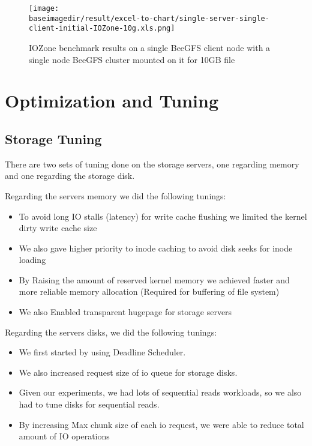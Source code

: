 \documentclass{article}
\newcommand{\baseimagedir}{..}
\begin{document}
\begin{figure}
    \centering
    \texttt{[image: \\baseimagedir/result/excel-to-chart/single-server-single-client-initial-IOZone-10g.xls.png]}
    \caption{IOZone benchmark results on a single BeeGFS client node with a single node BeeGFS cluster mounted on it for 10GB file}
    \label{fig:signle-server-single-client-initial-10g}
\end{figure}


\section{Optimization and Tuning}
\subsection{Storage Tuning}
There are two sets of tuning done on the storage servers, one regarding memory and one regarding the storage disk.

\noindent Regarding the servers memory we did the following tunings:

\begin{itemize}
\item To avoid long IO stalls (latency) for write cache flushing we limited the kernel dirty write cache size
\item We also gave higher priority to inode caching to avoid disk seeks for inode loading
\item By Raising the amount of reserved kernel memory we achieved faster and more reliable memory allocation (Required for buffering of file system)
\item We also Enabled transparent hugepage for storage servers
\end{itemize}

\noindent Regarding the servers disks, we did the following tunings:

\begin{itemize}
    \item We first started by using Deadline Scheduler.
    \item We also increased request size of io queue for storage disks.
    \item Given our experiments, we had lots of sequential reads workloads, so we also had to tune disks for sequential reads.
    \item By increasing Max chunk size of each io request, we were able to reduce total amount of IO operations
\end{itemize}
\end{document}
